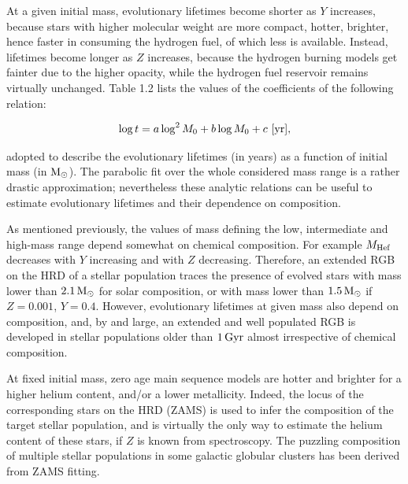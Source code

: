 \documentclass[a4paper,10pt]{article}
\begin{document}
{\noindent}At a given initial mass, evolutionary lifetimes become shorter as $Y$ increases, because stars with higher molecular weight are more compact, hotter, brighter, hence faster in consuming the hydrogen fuel, of which less is available. Instead, lifetimes become longer as $Z$ increases, because the hydrogen burning models get fainter due to the higher opacity, while the hydrogen fuel reservoir remains virtually unchanged. Table 1.2 lists the values of the coefficients of the following relation:

\begin{align*}
    \log t = a\log^2M_0 + b\log M_0 + c ~ [{\rm yr}],
\end{align*}

{\noindent}adopted to describe the evolutionary lifetimes (in years) as a function of initial mass (in ${\rm M_\odot}$). The parabolic fit over the whole considered mass range is a rather drastic approximation; nevertheless these analytic relations can be useful to estimate evolutionary lifetimes and their dependence on composition.

{\noindent}As mentioned previously, the values of mass defining the low, intermediate and high-mass range depend somewhat on chemical composition. For example $M_{\rm Hef}$ decreases with $Y$ increasing and with $Z$ decreasing. Therefore, an extended RGB on the HRD of a stellar population traces the presence of evolved stars with mass lower than $2.1\,{\rm M_\odot}$ for solar composition, or with mass lower than $1.5\,{\rm M_\odot}$ if $Z=0.001$, $Y=0.4$. However, evolutionary lifetimes at given mass also depend on composition, and, by and large, an extended and well populated RGB is developed in stellar populations older than $1\,{\rm Gyr}$ almost irrespective of chemical composition.

{\noindent}At fixed initial mass, zero age main sequence models are hotter and brighter for a higher helium content, and/or a lower metallicity. Indeed, the locus of the corresponding stars on the HRD (ZAMS) is used to infer the composition of the target stellar population, and is virtually the only way to estimate the helium content of these stars, if $Z$ is known from spectroscopy. The puzzling composition of multiple stellar populations in some galactic globular clusters has been derived from ZAMS fitting.
\end{document}
